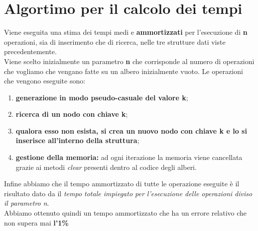 \documentclass[a4paper]{article}
\begin{document}
		\section{Algortimo per il calcolo dei tempi}
		Viene eseguita una stima dei tempi medi e \textbf{ammortizzati} per l'esecuzione di \textbf{n} operazioni, sia di inserimento che di ricerca, nelle tre strutture dati viste precedentemente. \\
		Viene scelto inizialmente un parametro \textbf{n} che corrisponde al numero di operazioni che vogliamo che vengano fatte su un albero inizialmente vuoto. Le operazioni che vengono eseguite sono:
		\begin{enumerate}
			\item \textbf{generazione in modo pseudo-casuale del valore k};
			\item \textbf{ricerca di un nodo con chiave k};
			\item \textbf{qualora esso non esista, si crea un nuovo nodo con chiave k e lo si inserisce all'interno della struttura};
			\item \textbf{gestione della memoria:} ad ogni iterazione la memoria viene cancellata grazie ai metodi \textit{clear} presenti dentro al codice degli alberi.
		\end{enumerate}
		Infine abbiamo che il tempo ammortizzato di tutte le operazione eseguite è il risultato dato da il \textit{tempo totale impiegato per l'esecuzione delle operazioni diviso il parametro n}.\\
		Abbiamo ottenuto quindi un tempo ammortizzato che ha un errore relativo che non supera mai 
		\textbf{l'1\%}
	
\end{document}
